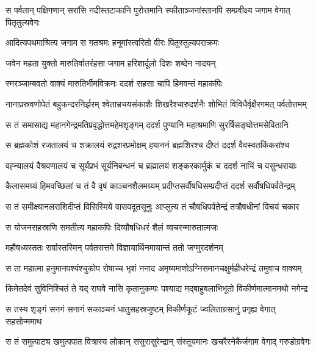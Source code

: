 \twolineshloka
{स पर्वतान् पक्षिगणान् सरांसि नदीस्तटाकानि पुरोत्तमानि}
{स्फीताञ्जनांस्तानपि सम्प्रवीक्ष्य जगाम वेगात् पितृतुल्यवेगः} %

\twolineshloka
{आदित्यपथमाश्रित्य जगाम स गतश्रमः}
{हनूमांस्त्वरितो वीरः पितुस्तुल्यपराक्रमः} %

\twolineshloka
{जवेन महता युक्तो मारुतिर्वातरंहसा}
{जगाम हरिशार्दूलो दिशः शब्देन नादयन्} %

\twolineshloka
{स्मरञ्जाम्बवतो वाक्यं मारुतिर्भीमविक्रमः}
{ददर्श सहसा चापि हिमवन्तं महाकपिः} %

\threelineshloka
{नानाप्रस्रवणोपेतं बहुकन्दरनिर्झरम्}
{श्वेताभ्रचयसंकाशैः शिखरैश्चारुदर्शनैः}
{शोभितं विविधैर्वृक्षैरगमत् पर्वतोत्तमम्} %

\twolineshloka
{स तं समासाद्य महानगेन्द्रमतिप्रवृद्धोत्तमहेमशृङ्गम्}
{ददर्श पुण्यानि महाश्रमाणि सुरर्षिसङ्घोत्तमसेवितानि} %

\twolineshloka
{स ब्रह्मकोशं रजतालयं च शक्रालयं रुद्रशरप्रमोक्षम्}
{हयाननं ब्रह्मशिरश्च दीप्तं ददर्श वैवस्वतकिंकरांश्च} %

\twolineshloka
{वह्न्यालयं वैश्रवणालयं च सूर्यप्रभं सूर्यनिबन्धनं च}
{ब्रह्मालयं शङ्करकार्मुकं च ददर्श नाभिं च वसुन्धरायाः} %

\twolineshloka
{कैलासमग्र्यं हिमवच्छिलां च तं वै वृषं काञ्चनशैलमग्र्यम्}
{प्रदीप्तसर्वौषधिसम्प्रदीप्तं ददर्श सर्वौषधिपर्वतेन्द्रम्} %

\twolineshloka
{स तं समीक्ष्यानलराशिदीप्तं विसिस्मिये वासवदूतसूनुः}
{आप्लुत्य तं चौषधिपर्वतेन्द्रं तत्रौषधीनां विचयं चकार} %

\twolineshloka
{स योजनसहस्राणि समतीत्य महाकपिः}
{दिव्यौषधिधरं शैलं व्यचरन्मारुतात्मजः} %

\twolineshloka
{महौषध्यस्ततः सर्वास्तस्मिन् पर्वतसत्तमे}
{विज्ञायार्थिनमायान्तं ततो जग्मुरदर्शनम्} %

\twolineshloka
{स ता महात्मा हनुमानपश्यंश्चुकोप रोषाच्च भृशं ननाद}
{अमृष्यमाणोऽग्निसमानचक्षुर्महीधरेन्द्रं तमुवाच वाक्यम्} %

\twolineshloka
{किमेतदेवं सुविनिश्चितं ते यद् राघवे नासि कृतानुकम्पः}
{पश्याद्य मद्बाहुबलाभिभूतो विकीर्णमात्मानमथो नगेन्द्र} %

\twolineshloka
{स तस्य शृङ्गं सनगं सनागं सकाञ्चनं धातुसहस्रजुष्टम्}
{विकीर्णकूटं ज्वलिताग्रसानुं प्रगृह्य वेगात् सहसोन्ममाथ} %

\twolineshloka
{स तं समुत्पाट्य खमुत्पपात वित्रास्य लोकान् ससुरासुरेन्द्रान्}
{संस्तूयमानः खचरैरनेकैर्जगाम वेगाद् गरुडोग्रवेगः} %

